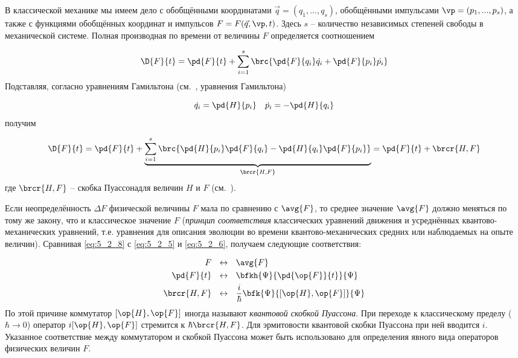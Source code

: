 В классической механике мы имеем дело с обобщёнными координатами $\vec{q} = (q_1, ..., q_s)$, обобщёнными импульсами $\vp = (p_1, ..., p_s)$, а также с функциями обобщённых координат и импульсов $F = F(\vec{q}, \vp, t)$. Здесь $s$ -- количество независимых степеней свободы в механической системе. Полная производная по времени от величины $F$ определяется соотношением

$$
\D{F}{t} = \pd{F}{t} + \sum_{i=1}^{s}\brc{\pd{F}{q_i} \dot{q_i} + \pd{F}{p_i} \dot{p_i} }
$$%
%
Подставляя, согласно уравнениям Гамильтона (см.~, уравнения Гамильтона)

$$
\dot{q_i} = \pd{H}{p_i} ~~~ \dot{p_i} = -\pd{H}{q_i}
$$%
%
получим

\begin{equation}
  \label{eq:5_2_8}
  \D{F}{t} = \pd{F}{t} + \underbrace{
    \sum_{i=1}^{s} \brc{ \pd{H}{p_i} \pd{F}{q_i} - \pd{H}{q_i} \pd{F}{p_i} }
  }_{\brcr{H, F}} = \pd{F}{t} + \brcr{H, F}
\end{equation}%
%
где $\brcr{H, F}$ -- скобка Пуассона\footnotemark для величин $H$ и $F$ (см.~).

Если неопределённость $\Delta F$ физической величины $F$ мала по сравнению с $\avg{F}$, то среднее значение $\avg{F}$ должно меняться по тому же закону, что и классическое значение $F$ ({\em принцип соответствия} классических уравнений движения и усреднённых квантово-механических уравнений, т.е. уравнения для описания эволюции во времени квантово-механических средних или наблюдаемых на опыте величин). Сравнивая \eqref{eq:5_2_8} с \eqref{eq:5_2_5} и \eqref{eq:5_2_6}, получаем следующие соответствия:

$$
\begin{aligned}
F ~~&\leftrightarrow~~ \avg{F} \\
\pd{F}{t} ~~&\leftrightarrow~~ \bfkh{\Psi}{\pd{\op{F}}{t}}{\Psi} \\
\brcr{H, F} ~~&\leftrightarrow~~ \frac{i}{\hbar} \bfk{\Psi}{ [\op{H}, \op{F}] }{\Psi}
\end{aligned}
$$%
%
По этой причине коммутатор $[\op{H}, \op{F}]$ иногда называют {\em квантовой скобкой Пуассона}. При переходе к классическому пределу ($\hbar \to 0$) оператор $i[\op{H}, \op{F}]$ стремится к $\hbar \brcr{H, F}$. Для эрмитовости квантовой скобки Пуассона при ней вводится $i$. Указанное соответствие между коммутатором и скобкой Пуассона может быть использовано для определения явного вида операторов физических величин $F$.

